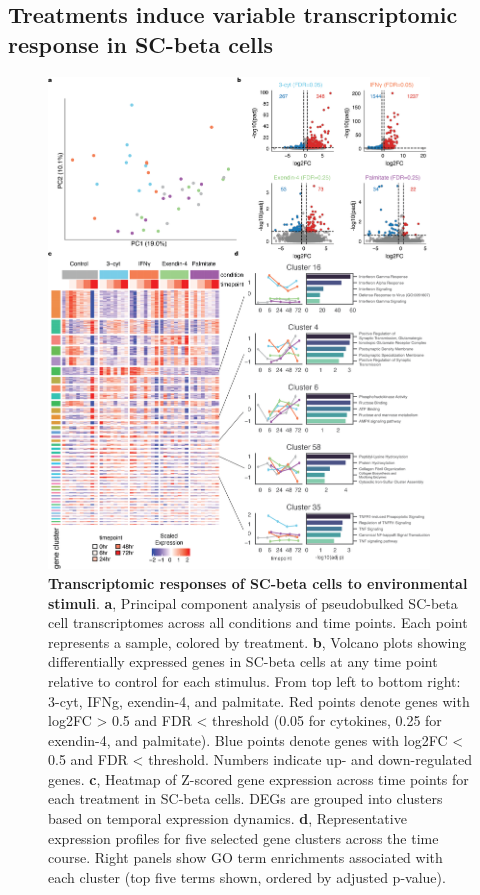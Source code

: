 \subsection{Treatments induce variable transcriptomic response in SC-beta cells}

\begin{figure}[p]
    \centering
    \includegraphics[width=0.9\textwidth, height=0.745\textheight]{3_figures-and-files/Fig2.png}
    \caption[Transcriptomic responses of SC-beta cells]{\textbf{Transcriptomic responses of SC-beta cells to environmental stimuli}. \textbf{a}, Principal component analysis of pseudobulked SC-beta cell transcriptomes across all conditions and time points. Each point represents a sample, colored by treatment. \textbf{b}, Volcano plots showing differentially expressed genes in SC-beta cells at any time point relative to control for each stimulus. From top left to bottom right: 3-cyt, IFNg, exendin-4, and palmitate. Red points denote genes with log2FC > 0.5 and FDR < threshold (0.05 for cytokines, 0.25 for exendin-4, and palmitate). Blue points denote genes with log2FC < 0.5 and FDR < threshold. Numbers indicate up- and down-regulated genes. \textbf{c}, Heatmap of Z-scored gene expression across time points for each treatment in SC-beta cells. DEGs are grouped into clusters based on temporal expression dynamics. \textbf{d}, Representative expression profiles for five selected gene clusters across the time course. Right panels show GO term enrichments associated with each cluster (top five terms shown, ordered by adjusted p-value).}
    \label{fig:3 Figure 2}
\end{figure}

